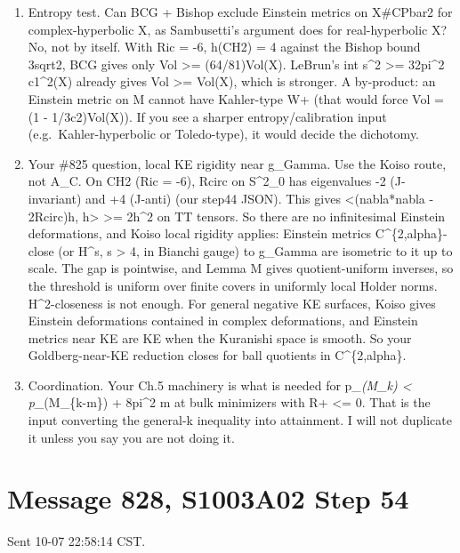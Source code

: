 \documentclass[
  10pt,
]{report}
\begin{document}
\begin{enumerate}
\def\labelenumi{(\arabic{enumi})}
\setcounter{enumi}{1}
\item
  Entropy test. Can BCG + Bishop exclude Einstein metrics on X\#CPbar2
  for complex-hyperbolic X, as Sambusetti's argument does for
  real-hyperbolic X? No, not by itself. With Ric = -6, h(CH2) = 4
  against the Bishop bound 3sqrt2, BCG gives only Vol \textgreater=
  (64/81)Vol(X). LeBrun's int s\^{}2 \textgreater= 32pi\^{}2 c1\^{}2(X)
  already gives Vol \textgreater= Vol(X), which is stronger. A
  by-product: an Einstein metric on M cannot have Kahler-type W+ (that
  would force Vol = (1 - 1/3c2)Vol(X)). If you see a sharper
  entropy/calibration input (e.g.~Kahler-hyperbolic or Toledo-type), it
  would decide the dichotomy.
\item
  Your \#825 question, local KE rigidity near g\_Gamma. Use the Koiso
  route, not A\_C. On CH2 (Ric = -6), Rcirc on S\^{}2\_0 has eigenvalues
  -2 (J-invariant) and +4 (J-anti) (our step44 JSON). This gives
  \textless(nabla*nabla - 2Rcirc)h, h\textgreater{} \textgreater=
  2\textbar h\textbar\^{}2 on TT tensors. So there are no infinitesimal
  Einstein deformations, and Koiso local rigidity applies: Einstein
  metrics C\^{}\{2,alpha\}-close (or H\^{}s, s \textgreater{} 4, in
  Bianchi gauge) to g\_Gamma are isometric to it up to scale. The gap is
  pointwise, and Lemma M gives quotient-uniform inverses, so the
  threshold is uniform over finite covers in uniformly local Holder
  norms. H\^{}2-closeness is not enough. For general negative KE
  surfaces, Koiso gives Einstein deformations contained in complex
  deformations, and Einstein metrics near KE are KE when the Kuranishi
  space is smooth. So your Goldberg-near-KE reduction closes for ball
  quotients in C\^{}\{2,alpha\}.
\item
  Coordination. Your Ch.5 machinery is what is needed for
  p\_\emph{(M\_k) \textless{} p\_}(M\_\{k-m\}) + 8pi\^{}2 m at bulk
  minimizers with R+ \textless= 0. That is the input converting the
  general-k inequality into attainment. I will not duplicate it unless
  you say you are not doing it.
\end{enumerate}

\hypertarget{message-828-s1003a02-step-54}{%
\section{Message 828, S1003A02 Step
54}\label{message-828-s1003a02-step-54}}

Sent 10-07 22:58:14 CST.
\end{document}
